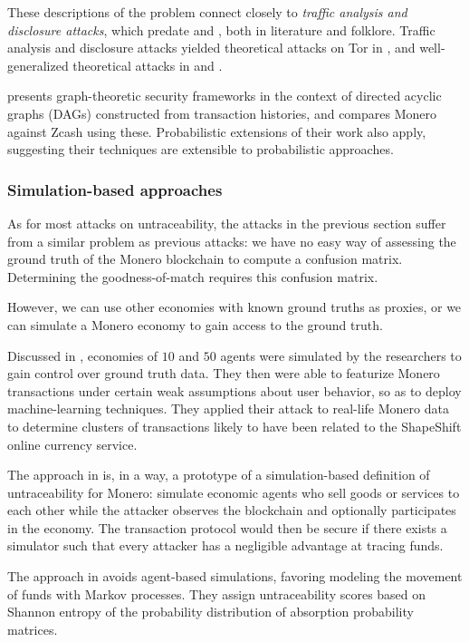 \documentclass{article}
\theoremstyle{definition}
\begin{document}
These descriptions of the problem connect closely to \textit{traffic analysis and disclosure attacks}, which predate \cite{danezis2003statistical} and \cite{agrawal2003measuring}, both in literature and folklore.
Traffic analysis and disclosure attacks yielded theoretical attacks on Tor in \cite{murdoch2005low}, and well-generalized theoretical attacks in \cite{troncoso2008perfect} and \cite{troncoso2009bayesian}.

\cite{wicht2023transaction} presents graph-theoretic security frameworks in the context of directed acyclic graphs (DAGs) constructed from transaction histories, and compares Monero against Zcash using these.
Probabilistic extensions of their work also apply, suggesting their techniques are extensible to probabilistic approaches.


\subsubsection{Simulation-based approaches}

As for most attacks on untraceability, the attacks in the previous section suffer from a similar problem as previous attacks: we have no easy way of assessing the ground truth of the Monero blockchain to compute a confusion matrix.
Determining the goodness-of-match requires this confusion matrix.

However, we can use other economies with known ground truths as proxies, or we can simulate a Monero economy to gain access to the ground truth.

Discussed in \cite{borggren2020simulated}, economies of $10$ and $50$ agents were simulated by the researchers to gain control over ground truth data.
They then were able to featurize Monero transactions under certain weak assumptions about user behavior, so as to deploy machine-learning techniques.
They applied their attack to real-life Monero data to determine clusters of transactions likely to have been related to the ShapeShift online currency service.

The approach in \cite{borggren2020simulated} is, in a way, a prototype of a simulation-based definition of untraceability for Monero: simulate economic agents who sell goods or services to each other while the attacker observes the blockchain and optionally participates in the economy.
The transaction protocol would then be secure if there exists a simulator such that every attacker has a negligible advantage at tracing funds.

The approach in \cite{kelen1towards} avoids agent-based simulations, favoring modeling the movement of funds with Markov processes.
They assign untraceability scores based on Shannon entropy of the probability distribution of absorption probability matrices.
\end{document}
